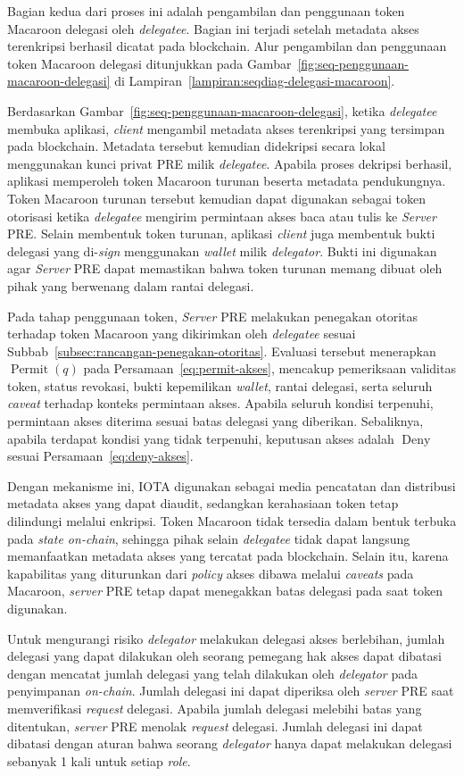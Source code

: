 Bagian kedua dari proses ini adalah pengambilan dan penggunaan token Macaroon delegasi oleh \textit{delegatee}. Bagian ini terjadi setelah metadata akses terenkripsi berhasil dicatat pada blockchain. Alur pengambilan dan penggunaan token Macaroon delegasi ditunjukkan pada Gambar~\ref{fig:seq-penggunaan-macaroon-delegasi} di Lampiran~\ref{lampiran:seqdiag-delegasi-macaroon}.

Berdasarkan Gambar~\ref{fig:seq-penggunaan-macaroon-delegasi}, ketika \textit{delegatee} membuka aplikasi, \textit{client} mengambil metadata akses terenkripsi yang tersimpan pada blockchain. Metadata tersebut kemudian didekripsi secara lokal menggunakan kunci privat PRE milik \textit{delegatee}. Apabila proses dekripsi berhasil, aplikasi memperoleh token Macaroon turunan beserta metadata pendukungnya. Token Macaroon turunan tersebut kemudian dapat digunakan sebagai token otorisasi ketika \textit{delegatee} mengirim permintaan akses baca atau tulis ke \textit{Server} PRE. Selain membentuk token turunan, aplikasi \textit{client} juga membentuk bukti delegasi yang di-\textit{sign} menggunakan \textit{wallet} milik \textit{delegator}. Bukti ini digunakan agar \textit{Server} PRE dapat memastikan bahwa token turunan memang dibuat oleh pihak yang berwenang dalam rantai delegasi.

Pada tahap penggunaan token, \textit{Server} PRE melakukan penegakan otoritas terhadap token Macaroon yang dikirimkan oleh \textit{delegatee} sesuai Subbab~\ref{subsec:rancangan-penegakan-otoritas}. Evaluasi tersebut menerapkan $\operatorname{Permit}(q)$ pada Persamaan~\ref{eq:permit-akses}, mencakup pemeriksaan validitas token, status revokasi, bukti kepemilikan \textit{wallet}, rantai delegasi, serta seluruh \textit{caveat} terhadap konteks permintaan akses. Apabila seluruh kondisi terpenuhi, permintaan akses diterima sesuai batas delegasi yang diberikan. Sebaliknya, apabila terdapat kondisi yang tidak terpenuhi, keputusan akses adalah $\operatorname{Deny}$ sesuai Persamaan~\ref{eq:deny-akses}.

Dengan mekanisme ini, IOTA digunakan sebagai media pencatatan dan distribusi metadata akses yang dapat diaudit, sedangkan kerahasiaan token tetap dilindungi melalui enkripsi. Token Macaroon tidak tersedia dalam bentuk terbuka pada \textit{state on-chain}, sehingga pihak selain \textit{delegatee} tidak dapat langsung memanfaatkan metadata akses yang tercatat pada blockchain. Selain itu, karena kapabilitas yang diturunkan dari \textit{policy} akses dibawa melalui \textit{caveats} pada Macaroon, \textit{server} PRE tetap dapat menegakkan batas delegasi pada saat token digunakan.

Untuk mengurangi risiko \textit{delegator} melakukan delegasi akses berlebihan, jumlah delegasi yang dapat dilakukan oleh seorang pemegang hak akses dapat dibatasi dengan mencatat jumlah delegasi yang telah dilakukan oleh \textit{delegator} pada penyimpanan \textit{on-chain}. Jumlah delegasi ini dapat diperiksa oleh \textit{server} PRE saat memverifikasi \textit{request} delegasi. Apabila jumlah delegasi melebihi batas yang ditentukan, \textit{server} PRE menolak \textit{request} delegasi. Jumlah delegasi ini dapat dibatasi dengan aturan bahwa seorang \textit{delegator} hanya dapat melakukan delegasi sebanyak 1 kali untuk setiap \textit{role}.